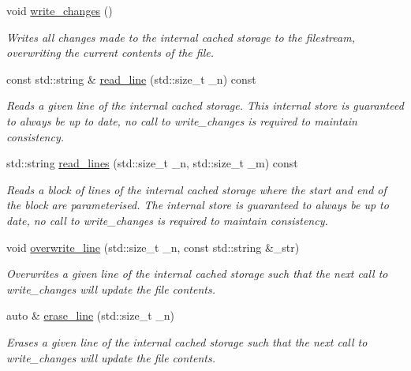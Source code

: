 \begin{DoxyCompactItemize}
void \hyperlink{classcrsc_1_1file__loader_ac9bb6c7bfaad062e7711746976417774}{write\+\_\+changes} ()
\begin{DoxyCompactList}\small\item\em Writes all changes made to the internal cached storage to the filestream, overwriting the current contents of the file. \end{DoxyCompactList}\item 
const std\+::string \& \hyperlink{classcrsc_1_1file__loader_a117e2d68f79e311bff7727ad6e8da1c5}{read\+\_\+line} (std\+::size\+\_\+t \+\_\+n) const 
\begin{DoxyCompactList}\small\item\em Reads a given line of the internal cached storage. This internal store is guaranteed to always be up to date, no call to write\+\_\+changes is required to maintain consistency. \end{DoxyCompactList}\item 
std\+::string \hyperlink{classcrsc_1_1file__loader_a3182907a6d983e07560fc9816baaf58f}{read\+\_\+lines} (std\+::size\+\_\+t \+\_\+n, std\+::size\+\_\+t \+\_\+m) const 
\begin{DoxyCompactList}\small\item\em Reads a block of lines of the internal cached storage where the start and end of the block are parameterised. The internal store is guaranteed to always be up to date, no call to write\+\_\+changes is required to maintain consistency. \end{DoxyCompactList}\item 
void \hyperlink{classcrsc_1_1file__loader_a372aa290d49ad8ef1bb2382f80a10186}{overwrite\+\_\+line} (std\+::size\+\_\+t \+\_\+n, const std\+::string \&\+\_\+str)
\begin{DoxyCompactList}\small\item\em Overwrites a given line of the internal cached storage such that the next call to write\+\_\+changes will update the file contents. \end{DoxyCompactList}\item 
auto \& \hyperlink{classcrsc_1_1file__loader_a434625df0a3c4f9c907e470f2994ac5c}{erase\+\_\+line} (std\+::size\+\_\+t \+\_\+n)
\begin{DoxyCompactList}\small\item\em Erases a given line of the internal cached storage such that the next call to write\+\_\+changes will update the file contents. \end{DoxyCompactList}\item 

\end{DoxyCompactItemize}
